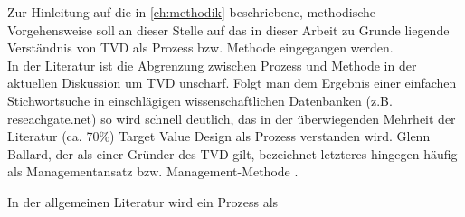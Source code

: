 Zur Hinleitung auf die in \cref{ch:methodik} beschriebene, methodische Vorgehensweise soll an dieser Stelle auf das in dieser Arbeit zu Grunde liegende Verständnis von \ac{TVD} als Prozess bzw. Methode eingegangen werden.\\
In der Literatur ist die Abgrenzung zwischen Prozess und Methode in der aktuellen Diskussion um TVD unscharf. Folgt man dem Ergebnis einer einfachen Stichwortsuche in einschlägigen wissenschaftlichen Datenbanken (z.B. reseachgate.net) so wird schnell deutlich, das in der überwiegenden Mehrheit der Literatur (ca. 70\%) Target Value Design als Prozess verstanden wird.
Glenn Ballard, der als einer Gründer des \ac{TVD} gilt, bezeichnet letzteres hingegen häufig als Managementansatz bzw. Management-Methode \autocite[]{}.

In der allgemeinen Literatur wird ein Prozess als 